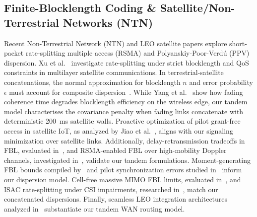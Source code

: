 \documentclass[journal]{IEEEtran}
\begin{document}
\subsection{Finite-Blocklength Coding \& Satellite/Non-Terrestrial Networks (NTN)}
Recent Non-Terrestrial Network (NTN) and LEO satellite papers explore short-packet rate-splitting multiple access (RSMA) and Polyanskiy-Poor-Verdú (PPV) dispersion. Xu et al.~\cite{xu_satellite} investigate rate-splitting under strict blocklength and QoS constraints in multilayer satellite communications. In terrestrial-satellite concatenations, the normal approximation for blocklength $n$ and error probability $\epsilon$ must account for composite dispersion~\cite{yang_fbl}. While Yang et al.~\cite{yang_fbl} show how fading coherence time degrades blocklength efficiency on the wireless edge, our tandem model characterises the covariance penalty when fading links concatenate with deterministic 200~ms satellite walls. Proactive optimization of pilot grant-free access in satellite IoT, as analyzed by Jiao et al.~\cite{jiao_satellite}, aligns with our signaling minimization over satellite links. Additionally, delay-retransmission tradeoffs in FBL, evaluated in~\cite{fbl_delay}, and RSMA-enabled FBL over high-mobility Doppler channels, investigated in~\cite{autonomous_rsma}, validate our tandem formulations. Moment-generating FBL bounds compiled by~\cite{math_ai_reasoning} and pilot synchronization errors studied in~\cite{pilot_sync} inform our dispersion model. Cell-free massive MIMO FBL limits, evaluated in~\cite{mimo_unsourced}, and ISAC rate-splitting under CSI impairments, researched in~\cite{isac_rsma}, match our concatenated dispersions. Finally, seamless LEO integration architectures analyzed in~\cite{seamless_ntn} substantiate our tandem WAN routing model.
\end{document}
